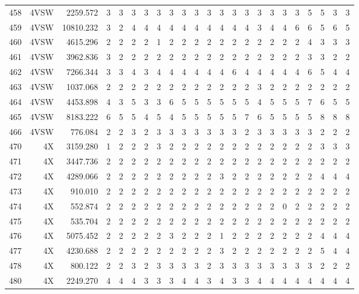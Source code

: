 \documentclass[12pt]{article}\usepackage[]{graphicx}\usepackage[]{color}
\begin{document}
\begin{landscapepage}
\begin{longtable}[t]{crrrrrrrrrrrrrrrcrrrrrr}
458 & 4VSW & 2259.572 & 3 & 3 & 3 & 3 & 3 & 3 & 3 & 3 & 3 & 3 & 3 & 3 & 3 & 3 & 3 & 3 & 5 & 5 & 3 & 3\\
459 & 4VSW & 10810.232 & 3 & 2 & 4 & 4 & 4 & 4 & 4 & 4 & 4 & 4 & 4 & 4 & 3 & 4 & 4 & 6 & 6 & 5 & 6 & 5\\
460 & 4VSW & 4615.296 & 2 & 2 & 2 & 2 & 1 & 2 & 2 & 2 & 2 & 2 & 2 & 2 & 2 & 2 & 2 & 2 & 4 & 3 & 3 & 3\\
461 & 4VSW & 3962.836 & 3 & 2 & 2 & 2 & 2 & 2 & 2 & 2 & 2 & 2 & 2 & 2 & 2 & 2 & 2 & 2 & 3 & 3 & 2 & 2\\
462 & 4VSW & 7266.344 & 3 & 3 & 4 & 3 & 4 & 4 & 4 & 4 & 4 & 4 & 6 & 4 & 4 & 4 & 4 & 4 & 6 & 5 & 4 & 4\\
463 & 4VSW & 1037.068 & 2 & 2 & 2 & 2 & 2 & 2 & 2 & 2 & 2 & 2 & 2 & 2 & 3 & 2 & 2 & 2 & 2 & 2 & 2 & 2\\
464 & 4VSW & 4453.898 & 4 & 3 & 5 & 3 & 3 & 6 & 5 & 5 & 5 & 5 & 5 & 5 & 4 & 5 & 5 & 5 & 7 & 6 & 5 & 5\\
465 & 4VSW & 8183.222 & 6 & 5 & 5 & 4 & 5 & 4 & 5 & 5 & 5 & 5 & 5 & 7 & 6 & 5 & 5 & 5 & 5 & 8 & 8 & 8\\
466 & 4VSW & 776.084 & 2 & 2 & 3 & 2 & 3 & 3 & 3 & 3 & 3 & 3 & 3 & 2 & 3 & 3 & 3 & 3 & 3 & 2 & 2 & 2\\
470 & 4X & 3159.280 & 1 & 2 & 2 & 2 & 3 & 2 & 2 & 2 & 2 & 2 & 2 & 2 & 2 & 2 & 2 & 2 & 2 & 3 & 3 & 3\\
471 & 4X & 3447.736 & 2 & 2 & 2 & 2 & 2 & 2 & 2 & 2 & 2 & 2 & 2 & 2 & 2 & 2 & 2 & 2 & 2 & 2 & 2 & 2\\
472 & 4X & 4289.066 & 2 & 2 & 2 & 2 & 2 & 2 & 2 & 2 & 2 & 3 & 2 & 2 & 2 & 2 & 2 & 2 & 2 & 4 & 4 & 4\\
473 & 4X & 910.010 & 2 & 2 & 2 & 2 & 2 & 2 & 2 & 2 & 2 & 2 & 2 & 2 & 2 & 2 & 2 & 2 & 2 & 2 & 2 & 2\\
474 & 4X & 552.874 & 2 & 2 & 2 & 2 & 2 & 2 & 2 & 2 & 2 & 2 & 2 & 2 & 2 & 2 & 0 & 2 & 2 & 2 & 2 & 2\\
475 & 4X & 535.704 & 2 & 2 & 2 & 2 & 2 & 2 & 2 & 2 & 2 & 2 & 2 & 2 & 2 & 2 & 2 & 2 & 2 & 2 & 2 & 2\\
476 & 4X & 5075.452 & 2 & 2 & 2 & 2 & 2 & 3 & 2 & 2 & 2 & 1 & 2 & 2 & 2 & 2 & 2 & 2 & 2 & 4 & 4 & 4\\
477 & 4X & 4230.688 & 2 & 2 & 2 & 2 & 2 & 2 & 2 & 2 & 2 & 3 & 2 & 2 & 2 & 2 & 2 & 2 & 2 & 5 & 4 & 4\\
478 & 4X & 800.122 & 2 & 2 & 3 & 2 & 3 & 3 & 3 & 3 & 2 & 3 & 3 & 3 & 3 & 3 & 3 & 3 & 3 & 2 & 2 & 2\\
480 & 4X & 2249.270 & 4 & 4 & 4 & 3 & 3 & 3 & 4 & 4 & 3 & 4 & 3 & 3 & 4 & 4 & 4 & 4 & 4 & 4 & 4 & 4\\

\end{longtable}
\end{landscapepage}
\end{document}
